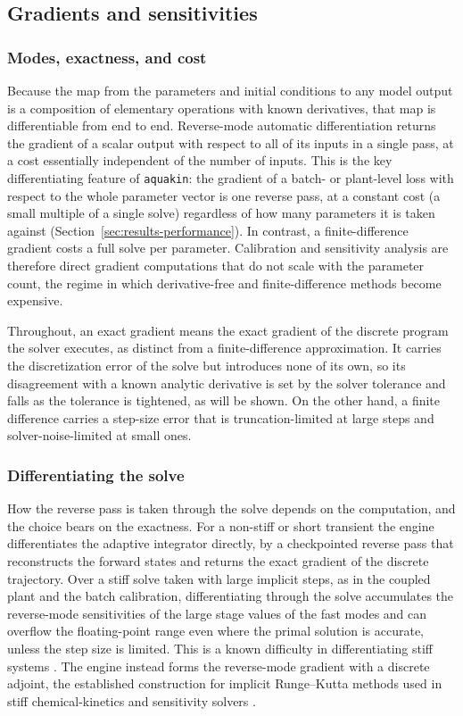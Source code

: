 \documentclass{article}
\begin{document}
\subsection{Gradients and sensitivities}
\label{sec:methods-ad}

\subsubsection{Modes, exactness, and cost}

Because the map from the parameters and initial conditions to any model output is a composition of elementary operations with known derivatives, that map is differentiable from end to end. Reverse-mode automatic differentiation returns the gradient of a scalar output with respect to all of its inputs in a single pass, at a cost essentially independent of the number of inputs. This is the key differentiating feature of \texttt{aquakin}: the gradient of a batch- or plant-level loss with respect to the whole parameter vector is one reverse pass, at a constant cost (a small multiple of a single solve) regardless of how many parameters it is taken against (Section~\ref{sec:results-performance}). In contrast, a finite-difference gradient costs a full solve per parameter. Calibration and sensitivity analysis are therefore direct gradient computations that do not scale with the parameter count, the regime in which derivative-free and finite-difference methods become expensive.

Throughout, an exact gradient means the exact gradient of the discrete program the solver executes, as distinct from a finite-difference approximation. It carries the discretization error of the solve but introduces none of its own, so its disagreement with a known analytic derivative is set by the solver tolerance and falls as the tolerance is tightened, as will be shown. On the other hand, a finite difference carries a step-size error that is truncation-limited at large steps and solver-noise-limited at small ones.

\subsubsection{Differentiating the solve}

How the reverse pass is taken through the solve depends on the computation, and the choice bears on the exactness. For a non-stiff or short transient the engine differentiates the adaptive integrator directly, by a checkpointed reverse pass that reconstructs the forward states and returns the exact gradient of the discrete trajectory. Over a stiff solve taken with large implicit steps, as in the coupled plant and the batch calibration, differentiating through the solve accumulates the reverse-mode sensitivities of the large stage values of the fast modes and can overflow the floating-point range even where the primal solution is accurate, unless the step size is limited. This is a known difficulty in differentiating stiff systems \citep{kim2021stiff}. The engine instead forms the reverse-mode gradient with a discrete adjoint, the established construction for implicit Runge--Kutta methods used in stiff chemical-kinetics and sensitivity solvers \citep{sandu2003, zhang2014}. 
\end{document}
